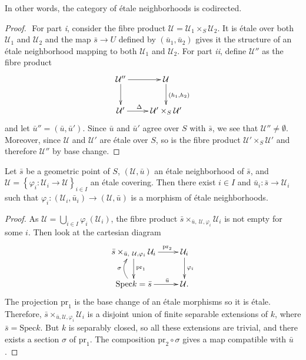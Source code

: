 \noindent
In other words, the category of \'etale neighborhoods is codirected.

\begin{proof} $ $
For part {\it i}, consider the fibre product $\mathcal{U} = \mathcal{U}_1 
\times_S \mathcal{U}_2$. It is \'etale over both $\mathcal{U}_1$ and 
$\mathcal{U}_2$ and the map $\bar s \to U$ defined by $(\bar u_1, \bar u_2)$ 
gives it the structure of an \'etale neighborhood mapping to both 
$\mathcal{U}_1$ and $\mathcal{U}_2$. For part {\it ii}, define $\mathcal{U}''$ 
as the fibre product 
$$
\xymatrix{
{\mathcal{U}''} \ar[r] \ar[d] & {\mathcal{U}} \ar^{(h_1,h_2)}[d] \\
{\mathcal{U}'} \ar^{\Delta \quad}[r] & {\mathcal{U}' \times_S \mathcal{U}'}
}
$$
and let $\bar u'' = (\bar u, \bar u')$. Since $\bar u$ and $\bar u'$ agree over 
$S$ with $\bar s$, we see that $\mathcal{U}''\neq\emptyset$. Moreover, since 
$\mathcal{U}$ and $\mathcal{U}'$ are \'etale over $S$, so is the fibre product 
$\mathcal{U}'\times_S \mathcal{U}'$ and therefore $\mathcal{U}''$ by base 
change.
\end{proof}

\begin{lemma} \label{lem:geomPointsAreInSomeOpen}
Let $\bar s$ be a geometric point of $S$, $(\mathcal{U}, \bar u)$ an \'etale 
neighborhood of $\bar s$, and $\mathcal{U} = \left\{\varphi_i : \mathcal{U}_i 
\to \mathcal{U} \right\}_{i\in I}$ an \'etale covering. Then there exist $i\in 
I$ and $\bar u_i: \bar s  \to \mathcal{U}_i$ such that $\varphi_i: 
(\mathcal{U}_i, \bar u_i) \to (\mathcal{U}, \bar u)$ is a morphism of \'etale 
neighborhoods.  
\end{lemma}

\begin{proof}
As $\mathcal{U} = \bigcup_{i\in I}\varphi_i(\mathcal{U}_i)$, the fibre product 
$\bar s \times_{\bar u, \ \mathcal{U}, \varphi_i} \mathcal{U}_i$ is not empty 
for some $i$. Then look at the cartesian diagram
$$
\xymatrix{ 
{\bar s \times_{\bar u, \ \mathcal{U}, \varphi_i} \mathcal{U}_i} 
\ar^{\text{pr}_1}[d] \ar^{\qquad \text{pr}_2}[r] & {\mathcal{U}_i} 
\ar^{\varphi_i}[d] \\ 
{\text{Spec} k = \bar s} \ar@/^1pc/^{\sigma}[u] \ar^{\qquad \bar u}[r] & 
{\mathcal{U}.} 
}
$$
The projection $\text{pr}_1$ is the base change of an \'etale morphisms so it 
is \'etale. Therefore, $\bar s \times_{\bar u , \mathcal{U}, \varphi_i} 
\mathcal{U}_i$ is a disjoint union of finite separable extensions of $k$, where 
$\bar s = \text{Spec} k$. But $k$ is separably closed, so all these extensions 
are trivial, and there exists a section $\sigma$ of $\text{pr}_1$. The 
composition 
$\text{pr}_2 \circ \sigma$ gives a map compatible with $\bar u$.
\end{proof}

